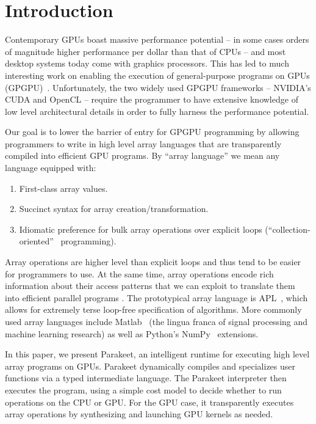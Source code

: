 \documentclass[preprint]{sigplanconf}
\begin{document}
\section{Introduction}
\label{Intro}

Contemporary GPUs boast massive performance potential -- in some cases orders of magnitude higher performance per dollar than that of CPUs -- and most desktop systems today come with graphics processors.  This has led to much interesting work on enabling the execution of general-purpose programs on GPUs (GPGPU)~\cite{Cata11,Main10,Muns10,NvidCU,Sven08,Tard06}. Unfortunately, the two widely used GPGPU frameworks -- NVIDIA's CUDA \cite{NvidCU} and OpenCL \cite{Muns10} -- require the programmer to have extensive knowledge of low level architectural details in order to fully harness the performance potential.

Our goal is to lower the barrier of entry for GPGPU programming by allowing programmers to write in high level array languages that are transparently compiled into efficient GPU programs. By ``array language'' we mean any language equipped with:
\begin{enumerate}
\item First-class array values.
\item Succinct syntax for array creation/transformation.
\item Idiomatic preference for bulk array operations over explicit loops (``collection-oriented''~\cite{Sip91} programming).
\end{enumerate}

Array operations are higher level than explicit loops and thus tend to be easier for programmers to use. At the same time, array operations encode rich information about their access patterns that we can exploit to translate them into efficient parallel programs \cite{Ju94}. The prototypical array language is APL~\cite{Iverson62}, which allows for extremely terse loop-free specification of algorithms. More commonly used array languages include Matlab~\cite{Moler80} (the lingua franca of signal processing and machine learning research) as well as Python's NumPy~\cite{Oliphant07} extensions.

In this paper, we present Parakeet, an intelligent runtime for executing high level array programs on GPUs. Parakeet dynamically compiles and specializes user functions via a typed intermediate language.  The Parakeet interpreter then executes the program, using a simple cost model to decide whether to run operations on the CPU or GPU.  For the GPU case, it transparently executes array operations by synthesizing and launching GPU kernels as needed.
\end{document}
